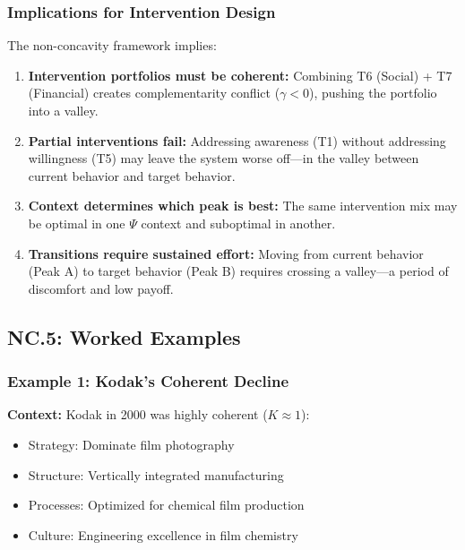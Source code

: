 \subsubsection{Implications for Intervention Design}

The non-concavity framework implies:

\begin{enumerate}
\item \textbf{Intervention portfolios must be coherent:} Combining T6 (Social) + T7 (Financial) creates complementarity conflict ($\gamma < 0$), pushing the portfolio into a valley.

\item \textbf{Partial interventions fail:} Addressing awareness (T1) without addressing willingness (T5) may leave the system worse off---in the valley between current behavior and target behavior.

\item \textbf{Context determines which peak is best:} The same intervention mix may be optimal in one $\Psi$ context and suboptimal in another.

\item \textbf{Transitions require sustained effort:} Moving from current behavior (Peak A) to target behavior (Peak B) requires crossing a valley---a period of discomfort and low payoff.
\end{enumerate}


\subsection{NC.5: Worked Examples}
\label{sec:nc-examples}

\subsubsection{Example 1: Kodak's Coherent Decline}

\textbf{Context:} Kodak in 2000 was highly coherent ($K \approx 1$):
\begin{itemize}
\item Strategy: Dominate film photography
\item Structure: Vertically integrated manufacturing
\item Processes: Optimized for chemical film production
\item Culture: Engineering excellence in film chemistry
\end{itemize}

